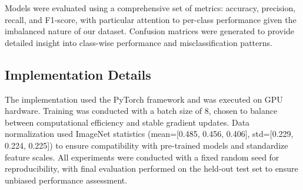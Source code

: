 Models were evaluated using a comprehensive set of metrics: accuracy, precision, recall, and F1-score, with particular attention to per-class performance given the imbalanced nature of our dataset. Confusion matrices were generated to provide detailed insight into class-wise performance and misclassification patterns.

\subsection{Implementation Details}
The implementation used the PyTorch framework and was executed on GPU hardware. Training was conducted with a batch size of 8, chosen to balance between computational efficiency and stable gradient updates. Data normalization used ImageNet statistics (mean=[0.485, 0.456, 0.406], std=[0.229, 0.224, 0.225]) to ensure compatibility with pre-trained models and standardize feature scales. All experiments were conducted with a fixed random seed for reproducibility, with final evaluation performed on the held-out test set to ensure unbiased performance assessment.
